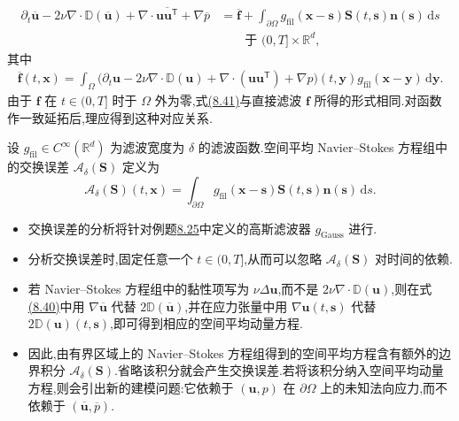 \begin{note}
\begin{equation}\label{eq:space-averaged-momentum-bounded-domain}
\begin{aligned}
 \partial_t\overline{\bm{u}}
  -2\nu\nabla\cdot\mathbb{D}(\overline{\bm{u}})
  +\nabla\cdot\overline{\bm{u}\bm{u}^{\mathsf T}}
  +\nabla\overline{p}
  &=\overline{\bm{f}}
    +\int_{\partial\Omega}
       g_{\mathrm{fil}}(\bm{x}-\bm{s})
       \bm{S}(t,\bm{s})\bm{n}(\bm{s})\,\mathrm{d}s\\
  &\qquad\text{于 }(0,T]\times\mathbb{R}^d,
\end{aligned}
\end{equation}
其中
\begin{equation}\label{eq:filtered-body-force-bounded-domain}
\begin{aligned}
 \overline{\bm{f}}(t,\bm{x})
  =\int_\Omega
     \bigl(
       \partial_t\bm{u}
       -2\nu\nabla\cdot\mathbb{D}(\bm{u})
       +\nabla\cdot(\bm{u}\bm{u}^{\mathsf T})
       +\nabla p
     \bigr)(t,\bm{y})
     g_{\mathrm{fil}}(\bm{x}-\bm{y})\,\mathrm{d}\bm{y}.
\end{aligned}
\end{equation}
由于 $\bm{f}$ 在 $t\in(0,T]$ 时于 $\Omega$ 外为零,式\hyperref[eq:filtered-body-force-bounded-domain]{(8.41)}与直接滤波 $\bm{f}$ 所得的形式相同.对函数作一致延拓后,理应得到这种对应关系.
\end{note}

\begin{definition}[交换误差]
\label{def:les-commutation-error}
设 $g_{\mathrm{fil}}\in C^\infty(\mathbb{R}^d)$ 为滤波宽度为 $\delta$ 的滤波函数.空间平均 Navier--Stokes 方程组中的交换误差 $\mathcal{A}_\delta(\bm{S})$ 定义为
\[
 \mathcal{A}_\delta(\bm{S})(t,\bm{x})
  =\int_{\partial\Omega}
     g_{\mathrm{fil}}(\bm{x}-\bm{s})
     \bm{S}(t,\bm{s})\bm{n}(\bm{s})\,\mathrm{d}s.
\]
\end{definition}

\begin{note}[关于交换误差]
\label{note:remarks-on-commutation-error}
\begin{itemize}
 \item 交换误差的分析将针对例题\hyperref[ex:gaussian-filter]{8.25}中定义的高斯滤波器 $g_{\mathrm{Gauss}}$ 进行.
 \item 分析交换误差时,固定任意一个 $t\in(0,T]$,从而可以忽略 $\mathcal{A}_\delta(\bm{S})$ 对时间的依赖.
 \item 若 Navier--Stokes 方程组中的黏性项写为 $\nu\Delta\bm{u}$,而不是 $2\nu\nabla\cdot\mathbb{D}(\bm{u})$,则在式\hyperref[eq:space-averaged-momentum-bounded-domain]{(8.40)}中用 $\nabla\overline{\bm{u}}$ 代替 $2\mathbb{D}(\overline{\bm{u}})$,并在应力张量中用 $\nabla\bm{u}(t,\bm{s})$ 代替 $2\mathbb{D}(\bm{u})(t,\bm{s})$,即可得到相应的空间平均动量方程.
 \item 因此,由有界区域上的 Navier--Stokes 方程组得到的空间平均方程含有额外的边界积分 $\mathcal{A}_\delta(\bm{S})$.省略该积分就会产生交换误差.若将该积分纳入空间平均动量方程,则会引出新的建模问题:它依赖于 $(\bm{u},p)$ 在 $\partial\Omega$ 上的未知法向应力,而不依赖于 $(\overline{\bm{u}},\overline{p})$.
\end{itemize}
\end{note}

